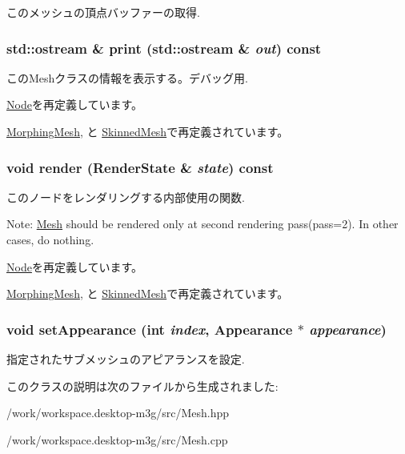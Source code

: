 このメッシュの頂点バッファーの取得. \hypertarget{classm3g_1_1Mesh_6fea17fa1532df3794f8cb39cb4f911f}{
\subsubsection[{print}]{\setlength{\rightskip}{0pt plus 5cm}std::ostream \& print (std::ostream \& {\em out}) const}}
\label{classm3g_1_1Mesh_6fea17fa1532df3794f8cb39cb4f911f}


このMeshクラスの情報を表示する。デバッグ用. 

\hyperlink{classm3g_1_1Node_6fea17fa1532df3794f8cb39cb4f911f}{Node}を再定義しています。

\hyperlink{classm3g_1_1MorphingMesh_6fea17fa1532df3794f8cb39cb4f911f}{MorphingMesh}, と \hyperlink{classm3g_1_1SkinnedMesh_6fea17fa1532df3794f8cb39cb4f911f}{SkinnedMesh}で再定義されています。\hypertarget{classm3g_1_1Mesh_8babc8a79b78615da51161e94029eea9}{
\subsubsection[{render}]{\setlength{\rightskip}{0pt plus 5cm}void render ({\bf RenderState} \& {\em state}) const}}
\label{classm3g_1_1Mesh_8babc8a79b78615da51161e94029eea9}


このノードをレンダリングする内部使用の関数.

Note: \hyperlink{classm3g_1_1Mesh}{Mesh} should be rendered only at second rendering pass(pass=2). In other cases, do nothing. 

\hyperlink{classm3g_1_1Node_8babc8a79b78615da51161e94029eea9}{Node}を再定義しています。

\hyperlink{classm3g_1_1MorphingMesh_8babc8a79b78615da51161e94029eea9}{MorphingMesh}, と \hyperlink{classm3g_1_1SkinnedMesh_8babc8a79b78615da51161e94029eea9}{SkinnedMesh}で再定義されています。\hypertarget{classm3g_1_1Mesh_bb03b872c453c4f8f3fe31e8b54d1b52}{
\subsubsection[{setAppearance}]{\setlength{\rightskip}{0pt plus 5cm}void setAppearance (int {\em index}, \/  {\bf Appearance} $\ast$ {\em appearance})}}
\label{classm3g_1_1Mesh_bb03b872c453c4f8f3fe31e8b54d1b52}


指定されたサブメッシュのアピアランスを設定. 

このクラスの説明は次のファイルから生成されました:\begin{CompactItemize}
\item 
/work/workspace.desktop-m3g/src/Mesh.hpp\item 
/work/workspace.desktop-m3g/src/Mesh.cpp\end{CompactItemize}

